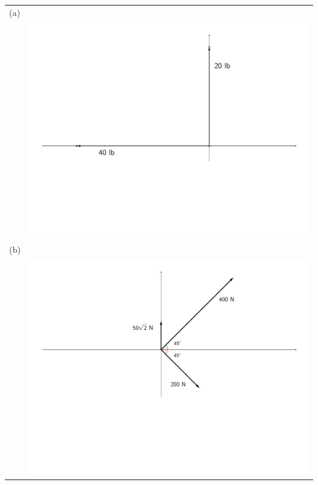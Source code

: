 \documentclass[12pt]{article}
\newif\ifans
\begin{document}
\begin{enumerate}
\begin{tabular}{ll}
(a) & \\
 & \includegraphics[scale=0.4]{vector7.pdf}\\
(b) & \\
 & \includegraphics[scale=0.4]{vector8.pdf}\\
\end{tabular}

\ifans{\fbox{\parbox{1\linewidth}{(a) The magnitude is $20\sqrt{5}$ lb at an angle of $\pi-\tan^{-1}\left(\frac{1}{2}\right)$ radians counterclockwise with the positive $x$ axis.\\
\\
(b) The magnitude is $150\sqrt{10}$ N at an angle of $\tan^{-1}\left(\frac{1}{2}\right)$ radians counterclockwise with the positive $x$ axis.}}} \fi


\end{enumerate}
\end{document}
